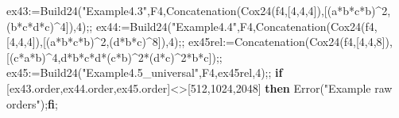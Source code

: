 \documentclass[
  10pt,
  letterpaper,
]{article}
\newenvironment{Shaded}{}{}
\newcommand{\BuiltInTok}[1]{\textcolor[rgb]{0.00,0.50,0.00}{#1}}
\newcommand{\ControlFlowTok}[1]{\textcolor[rgb]{0.00,0.44,0.13}{\textbf{#1}}}
\newcommand{\FloatTok}[1]{\textcolor[rgb]{0.25,0.63,0.44}{#1}}
\newcommand{\NormalTok}[1]{#1}
\newcommand{\OperatorTok}[1]{\textcolor[rgb]{0.40,0.40,0.40}{#1}}
\newcommand{\StringTok}[1]{\textcolor[rgb]{0.25,0.44,0.63}{#1}}
\newcommand{\VariableTok}[1]{\textcolor[rgb]{0.10,0.09,0.49}{#1}}
\begin{document}
\begin{Shaded}
\begin{Highlighting}[]
\VariableTok{ex43}\OperatorTok{:=}\VariableTok{Build24}\NormalTok{(}\StringTok{"Example4.3"}\OperatorTok{,}\VariableTok{F4}\OperatorTok{,}\BuiltInTok{Concatenation}\NormalTok{(}\VariableTok{Cox24}\NormalTok{(}\VariableTok{f4}\OperatorTok{,}\NormalTok{[}\FloatTok{4}\OperatorTok{,}\FloatTok{4}\OperatorTok{,}\FloatTok{4}\NormalTok{])}\OperatorTok{,}\NormalTok{[(}\VariableTok{a}\OperatorTok{*}\VariableTok{b}\OperatorTok{*}\VariableTok{c}\OperatorTok{*}\VariableTok{b}\NormalTok{)}\OperatorTok{\^{}}\FloatTok{2}\OperatorTok{,}\NormalTok{(}\VariableTok{b}\OperatorTok{*}\VariableTok{c}\OperatorTok{*}\VariableTok{d}\OperatorTok{*}\VariableTok{c}\NormalTok{)}\OperatorTok{\^{}}\FloatTok{4}\NormalTok{])}\OperatorTok{,}\FloatTok{4}\NormalTok{)}\OperatorTok{;;}
\VariableTok{ex44}\OperatorTok{:=}\VariableTok{Build24}\NormalTok{(}\StringTok{"Example4.4"}\OperatorTok{,}\VariableTok{F4}\OperatorTok{,}\BuiltInTok{Concatenation}\NormalTok{(}\VariableTok{Cox24}\NormalTok{(}\VariableTok{f4}\OperatorTok{,}\NormalTok{[}\FloatTok{4}\OperatorTok{,}\FloatTok{4}\OperatorTok{,}\FloatTok{4}\NormalTok{])}\OperatorTok{,}\NormalTok{[(}\VariableTok{a}\OperatorTok{*}\VariableTok{b}\OperatorTok{*}\VariableTok{c}\OperatorTok{*}\VariableTok{b}\NormalTok{)}\OperatorTok{\^{}}\FloatTok{2}\OperatorTok{,}\NormalTok{(}\VariableTok{d}\OperatorTok{*}\VariableTok{b}\OperatorTok{*}\VariableTok{c}\NormalTok{)}\OperatorTok{\^{}}\FloatTok{8}\NormalTok{])}\OperatorTok{,}\FloatTok{4}\NormalTok{)}\OperatorTok{;;}
\VariableTok{ex45rel}\OperatorTok{:=}\BuiltInTok{Concatenation}\NormalTok{(}\VariableTok{Cox24}\NormalTok{(}\VariableTok{f4}\OperatorTok{,}\NormalTok{[}\FloatTok{4}\OperatorTok{,}\FloatTok{4}\OperatorTok{,}\FloatTok{8}\NormalTok{])}\OperatorTok{,}\NormalTok{[(}\VariableTok{c}\OperatorTok{*}\VariableTok{a}\OperatorTok{*}\VariableTok{b}\NormalTok{)}\OperatorTok{\^{}}\FloatTok{4}\OperatorTok{,}\VariableTok{d}\OperatorTok{*}\VariableTok{b}\OperatorTok{*}\VariableTok{c}\OperatorTok{*}\VariableTok{d}\OperatorTok{*}\NormalTok{(}\VariableTok{c}\OperatorTok{*}\VariableTok{b}\NormalTok{)}\OperatorTok{\^{}}\FloatTok{2}\OperatorTok{*}\NormalTok{(}\VariableTok{d}\OperatorTok{*}\VariableTok{c}\NormalTok{)}\OperatorTok{\^{}}\FloatTok{2}\OperatorTok{*}\VariableTok{b}\OperatorTok{*}\VariableTok{c}\NormalTok{])}\OperatorTok{;;}
\VariableTok{ex45}\OperatorTok{:=}\VariableTok{Build24}\NormalTok{(}\StringTok{"Example4.5\_universal"}\OperatorTok{,}\VariableTok{F4}\OperatorTok{,}\VariableTok{ex45rel}\OperatorTok{,}\FloatTok{4}\NormalTok{)}\OperatorTok{;;}
\ControlFlowTok{if}\NormalTok{ [}\VariableTok{ex43}\NormalTok{.}\VariableTok{order}\OperatorTok{,}\VariableTok{ex44}\NormalTok{.}\VariableTok{order}\OperatorTok{,}\VariableTok{ex45}\NormalTok{.}\VariableTok{order}\NormalTok{]}\OperatorTok{\textless{}\textgreater{}}\NormalTok{[}\FloatTok{512}\OperatorTok{,}\FloatTok{1024}\OperatorTok{,}\FloatTok{2048}\NormalTok{] }\ControlFlowTok{then} \BuiltInTok{Error}\NormalTok{(}\StringTok{"Example raw orders"}\NormalTok{)}\OperatorTok{;}\ControlFlowTok{fi}\OperatorTok{;}

\end{Highlighting}
\end{Shaded}
\end{document}
